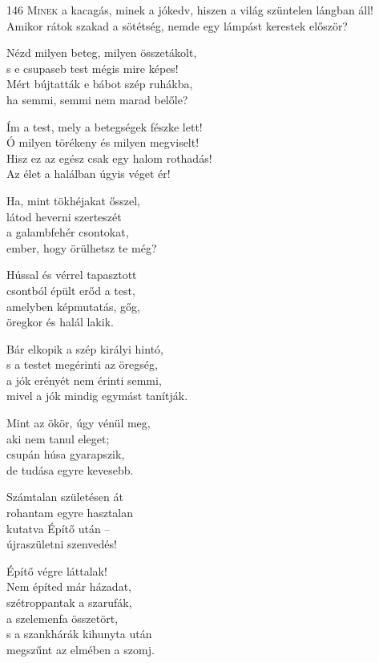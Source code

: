 
\begin{firstdhpverse}[-2pt]{146}
\lettrine{M}{inek} {\LettrineTextFont a kacagás, minek a jókedv,}\newline
hiszen a világ szüntelen lángban áll!\newline
Amikor rátok szakad a sötétség,\newline
nemde egy lámpást kerestek először?
\end{firstdhpverse}

\begin{dhpverse}

 Nézd milyen beteg, milyen összetákolt,\\
s e csupaseb test mégis mire képes!\\
Mért bújtatták e bábot szép ruhákba,\\
ha semmi, semmi nem marad belőle?

 Ím a test, mely a betegségek fészke lett!\\
Ó milyen törékeny és milyen megviselt!\\
Hisz ez az egész csak egy halom rothadás!\\
Az élet a halálban úgyis véget ér!

 Ha, mint tökhéjakat ősszel,\\
látod heverni szerteszét\\
a galambfehér csontokat,\\
ember, hogy örülhetsz te még?

\end{dhpverse}
\newpage
\begin{dhpverse}

 Hússal és vérrel tapasztott\\
csontból épült erőd a test,\\
amelyben képmutatás, gőg,\\
öregkor és halál lakik.

 Bár elkopik a szép királyi hintó,\\
s a testet megérinti az öregség,\\
a jók erényét nem érinti semmi,\\
mivel a jók mindig egymást tanítják.

 Mint az ökör, úgy vénül meg,\\
aki nem tanul eleget;\\
csupán húsa gyarapszik,\\
de tudása egyre kevesebb.

 Számtalan születésen át\\
rohantam egyre hasztalan\\
kutatva Építő után –\\
újraszületni szenvedés!

 Építő végre láttalak!\\
Nem építed már házadat,\\
szétroppantak a szarufák,\\
a szelemenfa összetört,\\
s a szankhárák kihunyta után\\
megszűnt az elmében a szomj.

\end{dhpverse}
